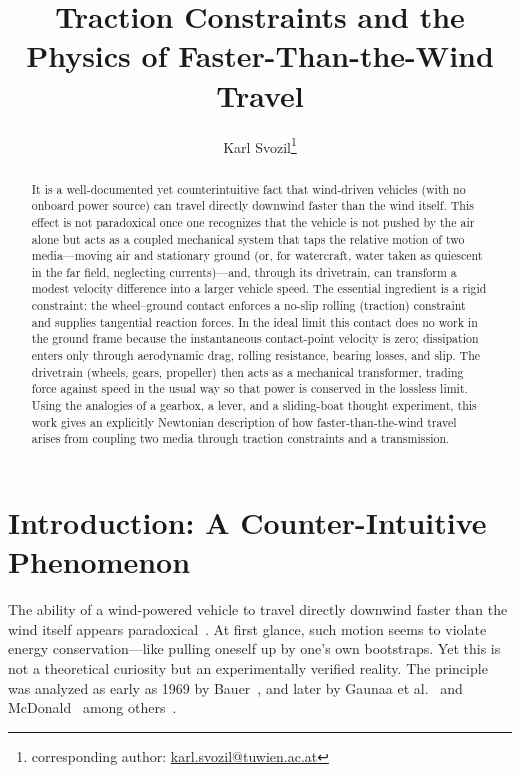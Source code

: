 \documentclass[a4paper]{article}
\begin{document}
\title{Traction Constraints and the Physics of Faster-Than-the-Wind Travel}

\author{Karl Svozil\footnote{corresponding author: \href{mailto:karl.svozil@tuwien.ac.at}{karl.svozil@tuwien.ac.at}}}

\maketitle

\begin{abstract}
It is a well-documented yet counterintuitive fact that wind-driven vehicles (with no onboard power source) can travel directly downwind faster than the wind itself. This effect is not paradoxical once one recognizes that the vehicle is not pushed by the air alone but acts as a coupled mechanical system that taps the relative motion of two media---moving air and stationary ground (or, for watercraft, water taken as quiescent in the far field, neglecting currents)---and, through its drivetrain, can transform a modest velocity difference into a larger vehicle speed. The essential ingredient is a rigid constraint: the wheel--ground contact enforces a no-slip rolling (traction) constraint and supplies tangential reaction forces. In the ideal limit this contact does no work in the ground frame because the instantaneous contact-point velocity is zero; dissipation enters only through aerodynamic drag, rolling resistance, bearing losses, and slip. The drivetrain (wheels, gears, propeller) then acts as a mechanical transformer, trading force against speed in the usual way so that power is conserved in the lossless limit. Using the analogies of a gearbox, a lever, and a sliding-boat thought experiment, this work gives an explicitly Newtonian description of how faster-than-the-wind travel arises from coupling two media through traction constraints and a transmission.
\end{abstract}



\section{Introduction: A Counter-Intuitive Phenomenon}

The ability of a wind-powered vehicle to travel directly downwind faster than the wind itself appears paradoxical~\cite{Blackford1978,Stong1975,McDonald2021}. At first glance, such motion seems to violate energy conservation---like pulling oneself up by one's own bootstraps. Yet this is not a theoretical curiosity but an experimentally verified reality. The principle was analyzed as early as 1969 by Bauer~\cite{Bauer1969,bauer1971sailing,bauer1974taking}, and later by  Gaunaa et al.~\cite{Gaunaa2009} and  McDonald~\cite{McDonald2021} among others~\cite{khan2013analysis,AAPT2013}.
\end{document}
